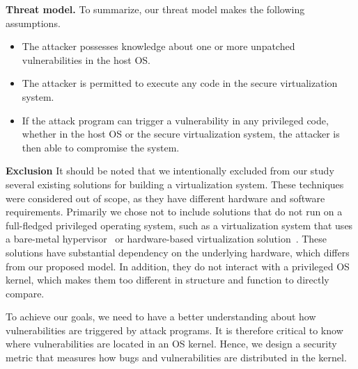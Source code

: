 \noindent\textbf{Threat model.}
To summarize, our threat model makes the following assumptions.

\begin{itemize}\setlength\itemsep{0em}

\item The attacker possesses knowledge about one or more unpatched vulnerabilities in the host OS.

\item The attacker is permitted to execute any code in the secure virtualization system.

\item If the attack program can trigger a vulnerability in any privileged code,
whether in the host OS or the secure virtualization system, the attacker is then able to
compromise the system.

\end{itemize}

\textbf{Exclusion}
It should be noted that we intentionally excluded from our study several existing
solutions for building a virtualization system. These techniques were considered
out of scope, as they have different hardware and software requirements.
Primarily we chose not to include solutions that do not run on a full-fledged
privileged operating system, such as a virtualization system that uses a
bare-metal hypervisor~\cite{Xen-03} or hardware-based virtualization
solution~\cite{IntelVT}. These solutions have substantial dependency on the
underlying hardware, which differs from our proposed model. In addition,
they do not interact with a privileged OS kernel, which makes them too different
in structure and function to directly compare.
 

To achieve our goals, we need to have a better understanding about how vulnerabilities are
triggered by attack programs. It is therefore critical to know where vulnerabilities are located in
an OS kernel. Hence, we design a security metric that measures how bugs and vulnerabilities
are distributed in the kernel.
